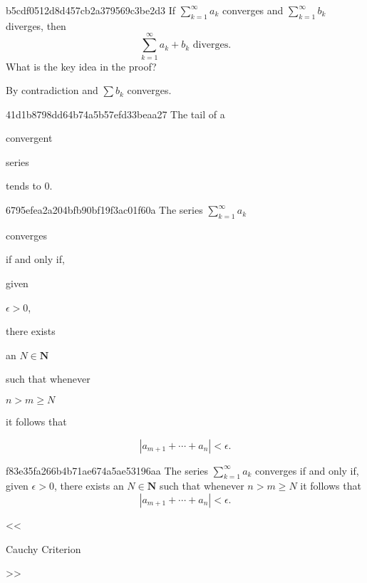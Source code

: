 \begin{note}{b5cdf0512d8d457cb2a379569c3be2d3}
    If \({ \sum_{k=1}^{\infty} a_k }\) converges and \({ \sum_{k=1}^{\infty} b_k }\) diverges, then
    \[
        \sum_{k=1}^{\infty} a_k + b_k \text{ diverges.}
    \]
    What is the key idea in the proof?

    \begin{cloze}{1}
        By contradiction and \({ \sum b_k }\) converges.
    \end{cloze}
\end{note}

\begin{note}{41d1b8798dd64b74a5b57efd33beaa27}
    The tail of a \begin{icloze}{2}convergent\end{icloze} series \begin{icloze}{1}tends to \({ 0 }\).\end{icloze}
\end{note}

\begin{note}{6795efea2a204bfb90bf19f3ac01f60a}
    The series \({ \sum_{k=1}^{\infty} a_k }\) \begin{icloze}{5}converges\end{icloze} \begin{icloze}{4}if and only if,\end{icloze} given \begin{icloze}{3}\({ \epsilon > 0 }\),\end{icloze} there exists \begin{icloze}{2}an \({ N \in \mathbf{N} }\)\end{icloze} such that whenever \begin{icloze}{2}\({ n > m \geq N }\)\end{icloze} it follows that
    \begin{icloze}{1}
        \[
            \left\lvert a_{m + 1} + \cdots + a_n \right\rvert < \epsilon.
        \]
    \end{icloze}
\end{note}

\begin{note}{f83e35fa266b4b71ae674a5ae53196aa}
    The series \({ \sum_{k=1}^{\infty} a_k }\) converges if and only if, given \({ \epsilon > 0 }\), there exists an \({ N \in \mathbf{N} }\) such that whenever \({ n > m \geq N }\) it follows that
    \[
        \left\lvert a_{m + 1} + \cdots + a_n \right\rvert < \epsilon.
    \]

    \begin{center}
        \tiny
        <<\begin{icloze}{1}Cauchy Criterion\end{icloze}>>
    \end{center}
\end{note}

